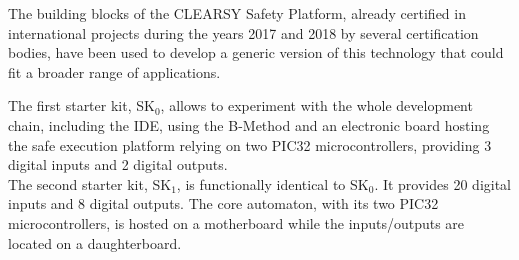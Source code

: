 The building blocks of the CLEARSY Safety Platform, already certified in international projects during the years 2017 and 2018 by several certification bodies, have been used to develop a generic version of this technology that could fit a broader range of applications. 


The first starter kit, SK$_0$, allows to experiment with the whole development chain, including the IDE, using the B-Method and an electronic board hosting the safe execution platform relying on two PIC32 microcontrollers, providing 3 digital inputs and 2 digital outputs.\\

The second starter kit, SK$_1$, is functionally identical to SK$_0$. It provides 20 digital inputs and 8 digital outputs. The core automaton, with its two PIC32 microcontrollers, is hosted on a motherboard while the inputs/outputs are located on a daughterboard.

